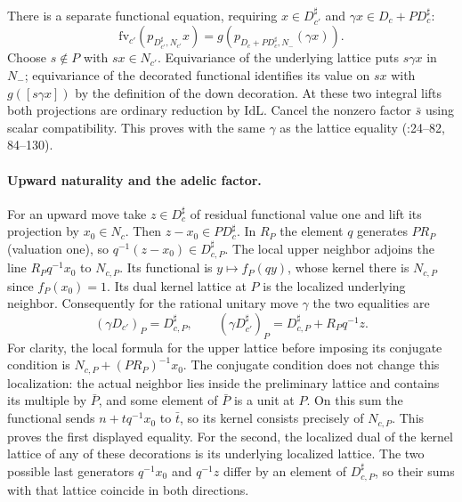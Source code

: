 There is a separate functional equation, requiring
$x\in D_{c'}^\sharp$ and $\gamma x\in D_c+PD_c^\sharp$:
\[
 \mathrm{fv}_{c'}(p_{D_{c'}^\sharp,N_{c'}}x)
     =g(p_{D_c+PD_c^\sharp,N_-}(\gamma x)).
\]
Choose $s\notin P$ with $sx\in N_{c'}$. Equivariance of the underlying
lattice puts $s\gamma x$ in $N_-$; equivariance of the decorated
functional identifies its value on $sx$ with $g([s\gamma x])$ by the
definition of the down decoration. At these two integral lifts both
projections are ordinary reduction by $\mathrm{IdL}$. Cancel the
nonzero factor $\bar s$ using scalar compatibility. This proves
 with the same $\gamma$ as the lattice
equality (:24--82, 84--130).

\paragraph{Upward naturality and the adelic factor.}
For an upward move take $z\in D_c^\sharp$ of residual functional
value one and lift its projection by $x_0\in N_c$.
Then $z-x_0\in PD_c^\sharp$. In $R_P$ the element $q$ generates
$P R_P$ (valuation one), so $q^{-1}(z-x_0)\in D_{c,P}^\sharp$.
The local upper neighbor adjoins the line $R_Pq^{-1}x_0$ to $N_{c,P}$.
Its functional is $y\mapsto f_P(qy)$, whose kernel there is
$N_{c,P}$ since $f_P(x_0)=1$. Its dual kernel lattice at $P$
is the localized underlying neighbor. Consequently for the rational
unitary move $\gamma$ the two equalities are
\[
 (\gamma D_{c'} )_P = D_{c,P}^\sharp,\qquad
 (\gamma D_{c'}^\sharp)_P =
        D_{c,P}^\sharp+R_Pq^{-1}z .
\]
For clarity, the local formula for the upper lattice before
imposing its conjugate condition is
$N_{c,P}+(P R_P)^{-1}x_0$. The conjugate condition does not change
this localization: the actual neighbor lies inside the preliminary
lattice and contains its multiple by $\bar P$, and some element of
$\bar P$ is a unit at $P$. On this sum the functional sends
$n+tq^{-1}x_0$ to $\bar t$, so its kernel consists precisely of
$N_{c,P}$. This proves the first displayed equality. For the second,
the localized dual of the kernel lattice of any of these decorations
is its underlying localized lattice. The two possible last generators
$q^{-1}x_0$ and $q^{-1}z$ differ by an element of $D_{c,P}^\sharp$,
so their sums with that lattice coincide in both directions.


